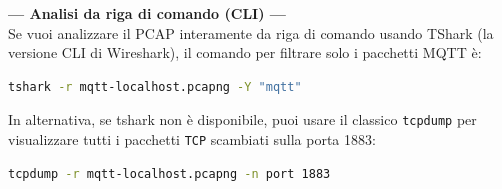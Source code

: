 \documentclass[11pt]{article}
\begin{document}
\begin{tcolorbox}[colback=green!5!white,colframe=green!75!black,title=\textbf{RISPOSTA}, breakable]
\textbf{--- Analisi da riga di comando (CLI) ---}\\
Se vuoi analizzare il PCAP interamente da riga di comando usando TShark (la versione CLI di Wireshark), il comando per filtrare solo i pacchetti MQTT è:
\begin{lstlisting}[language=bash, basicstyle=\ttfamily\small]
tshark -r mqtt-localhost.pcapng -Y "mqtt"
\end{lstlisting}
In alternativa, se tshark non è disponibile, puoi usare il classico \texttt{tcpdump} per visualizzare tutti i pacchetti \texttt{TCP} scambiati sulla porta 1883:
\begin{lstlisting}[language=bash, basicstyle=\ttfamily\small]
tcpdump -r mqtt-localhost.pcapng -n port 1883
\end{lstlisting}
\end{tcolorbox}
\end{document}
